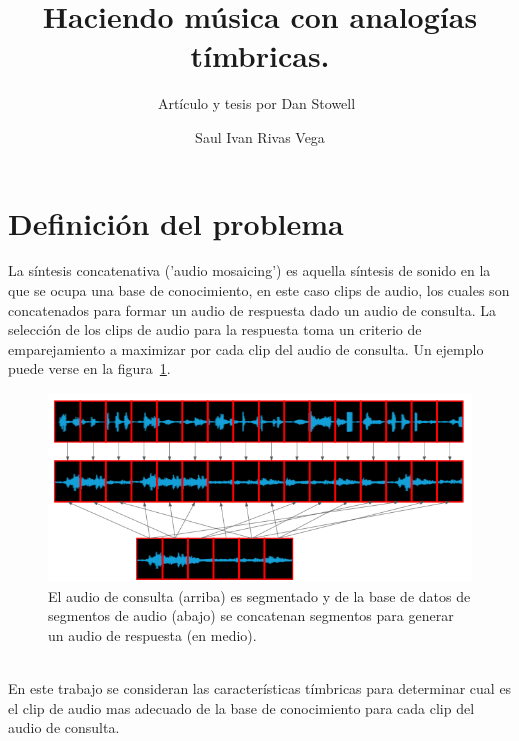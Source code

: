 \documentclass[runningheads]{llncs}
\begin{document}
%
\title{Haciendo música con analogías tímbricas.}
\subtitle{Artículo y tesis por Dan Stowell~\cite{stowell_making_2010,stowell_learning_2011}}
%
%
\author{Saul Ivan Rivas Vega}
%
%
%
\maketitle              %
%
%
%
\section{Definición del problema}
La síntesis concatenativa ('audio mosaicing') es aquella síntesis de sonido en la que se ocupa una base de conocimiento, en este caso clips de audio, los cuales son concatenados para formar un audio de respuesta dado un audio de consulta. La selección de los clips de audio para la respuesta toma un criterio de emparejamiento a maximizar por cada clip del audio de consulta. Un ejemplo puede verse en la figura~\ref{fig0}. 
\\
\begin{figure}[h!]
	\begin{center}
			\includegraphics[scale=0.5093]{Captura_000}
		\caption{El audio de consulta (arriba) es segmentado y de la base de datos de segmentos de audio (abajo) se concatenan segmentos para generar un audio de respuesta (en medio).}
		\label{fig0}
	\end{center}
\end{figure}\\
En este trabajo se consideran las características tímbricas para determinar cual es el clip de audio mas adecuado de la base de conocimiento para cada clip del audio de consulta.
\end{document}
